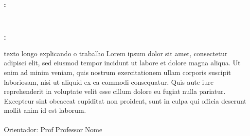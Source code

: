 \begin{center}

    \thispagestyle{empty}

    \begin{large}
        \printAuthors
    \end{large}
    

    \vfill

    \begin{Large}
        \textbf{\uppercase\expandafter{\TitleNameEnglish}:} \\
        \textbf{\uppercase\expandafter{\SubtitleNameEnglish}}
    \end{Large} \\
    \begin{Large}
        \textbf{\uppercase\expandafter{\TitleName}:} \\
        \textbf{\uppercase\expandafter{\SubtitleName}}
    \end{Large}

\end{center}

\vspace{3em}

\begin{adjustwidth}{7.5cm}{}
    \noindent texto longo explicando o trabalho Lorem ipsum dolor sit amet, consectetur adipisci elit, sed eiusmod tempor incidunt ut labore et dolore magna aliqua. Ut enim ad minim veniam, quis nostrum exercitationem ullam corporis suscipit laboriosam, nisi ut aliquid ex ea commodi consequatur. Quis aute iure reprehenderit in voluptate velit esse cillum dolore eu fugiat nulla pariatur. Excepteur sint obcaecat cupiditat non proident, sunt in culpa qui officia deserunt mollit anim id est laborum. \\ \ \\
    Orientador: Prof Professor Nome
\end{adjustwidth}

\vfill

\begin{center}
    \begin{large}
        \printCity \\
        \the \year
    \end{large}
\end{center}

\newpage